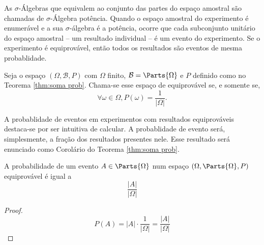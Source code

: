 As $\sigma$-Álgebras que equivalem ao conjunto das partes do espaço amostral são
chamadas de $\sigma$-Álgebra potência.
Quando o espaço amostral do experimento é enumerável e a sua $\sigma$-álgebra é a potência,
ocorre que cada subconjunto unitário do espaço amostral -- um resultado individual -- é um
evento do experimento.
Se o experimento é equiprovável, então todos os resultados são eventos de mesma probablidade.

\begin{def:evento equiprovavel}
Seja o espaço $(\Omega, \mathcal{B}, P)$ com $\Omega$ finito, $\mathcal{B} = \Parts{\Omega}$
e $P$ definido como no Teorema \ref{thm:soma prob}.
Chama-se esse espaço de equiprovável se, e somente se,
\[
	\forall \omega \in \Omega, P(\omega) = \frac{1}{|\Omega|}.
\]
\end{def:evento equiprovavel}

A probablidade de eventos em experimentos com resultados equiprováveis destaca-se
por ser intuitiva de calcular. A probablidade de evento será, simplesmente, a
fração dos resultados presentes nele. Esse resultado será enunciado como Corolário
do Teorema \ref{thm:soma prob}.

\begin{cor:equiprovavel}
\label{prop:equiprovavel}
A probabilidade de um evento $A \in \Parts{\Omega}$ num espaço $(\Omega, \Parts{\Omega}, P)$
equiprovável é igual a
\[
	\frac{|A|}{|\Omega|}
\]
\begin{proof}
	\[
		P(A) = |A| \cdot \frac{1}{|\Omega|} = \frac{|A|}{|\Omega|}
	\]
\end{proof}
\end{cor:equiprovavel}
